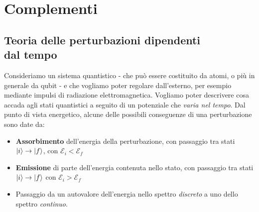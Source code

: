 \documentclass[../../InformazioneQuantistica.tex]{subfiles}
\begin{document}
\chapter{Complementi}
\section{Teoria delle perturbazioni dipendenti\\ dal tempo}
Consideriamo un sistema quantistico - che può essere costituito da atomi, o più in generale da qubit - e che vogliamo poter regolare dall'esterno, per esempio mediante impulsi di radiazione elettromagnetica. Vogliamo poter descrivere cosa accada agli stati quantistici a seguito di un potenziale che \textit{varia nel tempo}. Dal punto di vista energetico, alcune delle possibili conseguenze di una perturbazione sono date da:
\begin{itemize}
\item \textbf{Assorbimento} dell'energia della perturbazione, con passaggio tra stati $\Ket{i} \to \Ket{f}$, con $\mathcal{E}_i < \mathcal{E}_f$
\item \textbf{Emissione} di parte dell'energia contenuta nello stato, con passaggio tra stati $\Ket{i}\to \Ket{f}$ con $\mathcal{E}_i > \mathcal{E}_f$
\item Passaggio da un autovalore dell'energia nello spettro \textit{discreto} a uno dello spettro \textit{continuo}.
\end{itemize}
\end{document}
